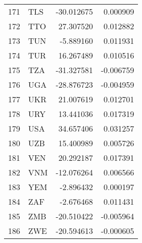 \begin{tabular}{llrr}
171 & TLS & -30.012675 & 0.000909 \\
172 & TTO & 27.307520 & 0.012882 \\
173 & TUN & -5.889160 & 0.011931 \\
174 & TUR & 16.267489 & 0.010516 \\
175 & TZA & -31.327581 & -0.006759 \\
176 & UGA & -28.876723 & -0.004959 \\
177 & UKR & 21.007619 & 0.012701 \\
178 & URY & 13.441036 & 0.017319 \\
179 & USA & 34.657406 & 0.031257 \\
180 & UZB & 15.400989 & 0.005726 \\
181 & VEN & 20.292187 & 0.017391 \\
182 & VNM & -12.076264 & 0.006566 \\
183 & YEM & -2.896432 & 0.000197 \\
184 & ZAF & -2.676468 & 0.011431 \\
185 & ZMB & -20.510422 & -0.005964 \\
186 & ZWE & -20.594613 & -0.000605 \\
\bottomrule
\end{tabular}
